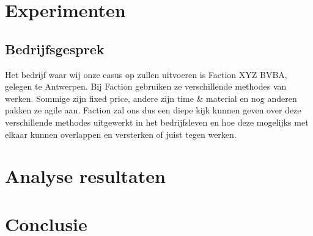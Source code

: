 \documentclass{hogent-article}
\begin{document}
	\section{Experimenten}
    \subsection{Bedrijfsgesprek}
    Het bedrijf waar wij onze casus op zullen uitvoeren is Faction XYZ BVBA, gelegen te Antwerpen. Bij Faction gebruiken ze verschillende methodes van werken. Sommige zijn fixed price, andere zijn time \& material en nog anderen pakken ze agile aan. Faction zal ons dus een diepe kijk kunnen geven over deze verschillende methodes uitgewerkt in het bedrijfsleven en hoe deze mogelijks met elkaar kunnen overlappen en versterken of juist tegen werken.
	\section{Analyse resultaten}
	

	
	\section{Conclusie}
	

	
	
	\printbibliography[heading=bibintoc]
	
\end{document}
